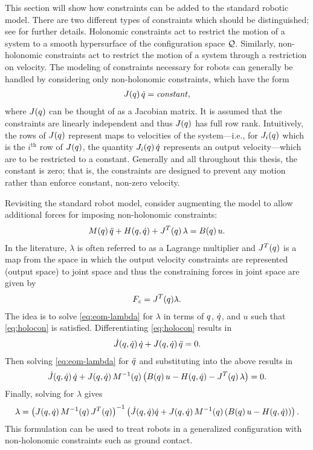 This section will show how constraints can be added to the standard robotic
model.
%
There are two different types of constraints which should be distinguished; see
\cite[Ch. 6]{Murray1994} for further details.
%
Holonomic constraints act to restrict the motion of a system to a smooth
hypersurface of the configuration space $\mathcal{Q}$.
%
Similarly, non-holonomic constraints act to restrict the motion of a system
through a restriction on velocity.
%
The modeling of constraints necessary for robots can generally be handled by
considering only non-holonomic constraints, which have the form
\begin{align}
  \label{eq:holocon}
  J(q) \, \dot{q} = \mathit{constant},
\end{align}
where $J(q)$ can be thought of as a Jacobian matrix.
%
It is assumed that the constraints are linearly independent and thus $J(q)$
has full row rank.
%
Intuitively, the rows of $J(q)$ represent maps to velocities of the
system---i.e., for $J_{i}(q)$ which is the $i^{\mathrm{th}}$ row of $J(q)$,
the quantity $J_{i}(q) \, \dot{q}$ represents an output velocity---which are to
be restricted to a constant.
%
Generally and all throughout this thesis, the constant is zero; that is, the
constraints are designed to prevent any motion rather than enforce constant,
non-zero velocity.

Revisiting the standard robot model, consider augmenting the model to allow
additional forces for imposing non-holonomic constraints:
%
\begin{align}
  \label{eq:eom-lambda}
  M(q) \, \ddot{q} + H(q, \dot{q}) + J^{T}(q) \, \lambda = B(q) \, u.
\end{align}
%
In the literature, $\lambda$ is often referred to as a Lagrange multiplier
\cite[\S 4.10]{Baruh1998} and $J^{T}(q)$ is a map from the space in which the
output velocity constraints are represented (output space) to joint space and
thus the constraining forces in joint space are given by
%
\begin{align*}
  F_{\mathit{c}} = J^{T}(q) \lambda.
\end{align*}
The idea is to solve \eqref{eq:eom-lambda} for $\lambda$ in terms of $q$,
$\dot{q}$, and $u$ such that \eqref{eq:holocon} is satisfied.
%
Differentiating \eqref{eq:holocon} results in
\begin{align*}
 {\dot J}(q, \dot{q}) \, \dot{q} + J(q, \dot{q}) \, \ddot{q} = 0.
\end{align*}
%
Then solving \eqref{eq:eom-lambda} for $\ddot{q}$ and substituting into the above
results in
\begin{align*}
  {\dot J}(q, \dot{q}) \, \dot{q} + J(q, \dot{q}) \, M^{-1}(q) \left(B(q) \, u
    -H(q, \dot{q}) - J^{T}(q) \, \lambda \right) = 0.
\end{align*}
Finally, solving for $\lambda$ gives
\begin{align*}
   \lambda = \left( J(q, \dot{q}) \, M^{-1}(q) \, J^{T}(q) \right)^{-1}
   \left( {\dot J}(q, \dot{q}) \dot{q} + J(q, \dot{q}) \, M^{-1}(q) \left(B(q) \, u
    -H(q, \dot{q})\right) \right).
\end{align*}
%
This formulation can be used to treat robots in a generalized configuration
with non-holonomic constraints such as ground contact.

